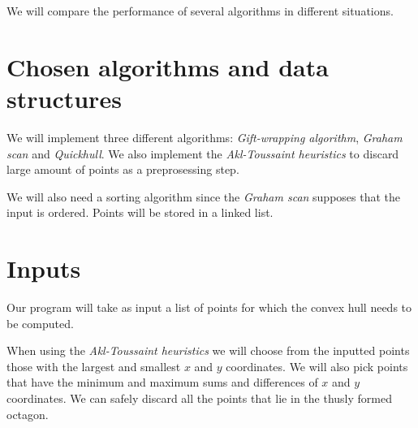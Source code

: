 \documentclass[a4paper,12pt,leqno,titlepage]{article}
\begin{document}
We will compare the performance of several algorithms in different situations.
\pagebreak
\section{Chosen algorithms and data structures}
We will implement three different algorithms: \emph{Gift-wrapping algorithm}, \emph{Graham scan} and \emph{Quickhull}.
We also implement the \emph{Akl-Toussaint heuristics} to discard large amount of points as a preprosessing step.

We will also need a sorting algorithm since the \emph{Graham scan} supposes that the input is ordered.
Points will be stored in a linked list.

\pagebreak
\section{Inputs}
Our program will take as input a list of points for which the convex hull needs to be computed.

When using the \emph{Akl-Toussaint heuristics} we will choose from the inputted points those with the largest and smallest $x$ and $y$ coordinates.
We will also pick points that have the minimum and maximum sums and differences of $x$ and $y$ coordinates.
We can safely discard all the points that lie in the thusly formed octagon.
\end{document}
